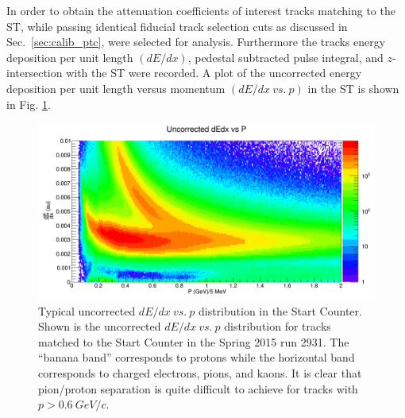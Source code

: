 In order to obtain the attenuation coefficients of interest tracks matching to the ST, while passing identical fiducial track selection cuts as discussed in Sec.~\ref{sec:calib_ptc}, were selected for analysis.  Furthermore the tracks energy deposition per unit length $(dE / dx)$, pedestal subtracted pulse integral,  and $z$-intersection with the ST were recorded.  A plot of the uncorrected energy deposition per unit length versus momentum $(dE / dx\ vs.\ p)$ in the ST is shown in Fig. \ref{fig:dEdx_vs_p_uncorr}.
	\begin{figure}[!htb]
		\centering
		\includegraphics[width=1.0\columnwidth]{calibration/figs/dEdx_vs_p_uncorr}
		\caption{Typical uncorrected $dE/dx\ vs.\ p$ distribution in the Start Counter.  Shown is the uncorrected $dE/dx\ vs.\ p$ distribution for tracks matched to the Start Counter in the Spring 2015 run 2931. The ``banana band'' corresponds to protons while the horizontal band corresponds to charged electrons, pions, and kaons.  It is clear that pion/proton separation is quite difficult to achieve for tracks with $p > 0.6\ GeV/c$.}
		\label{fig:dEdx_vs_p_uncorr}
	\end{figure}

